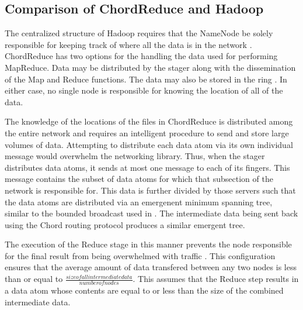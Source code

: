 \documentclass[conference, compsocconf, letterpaper]{IEEEtran}
\begin{document}
\subsection{Comparison of ChordReduce and Hadoop}

The centralized structure of Hadoop requires that the NameNode be solely responsible for keeping track of where all the data is in the network \cite{Hadoop}.  ChordReduce has two options for the handling the data used for performing MapReduce.  Data may be distributed by the stager along with the dissemination of the Map and Reduce functions.  The data may also be stored in the ring \cite{CFS}.  In either case, no single node is responsible for knowing the location of all of the data.  

The knowledge of the locations of the files in ChordReduce is distributed among the entire network and requires an intelligent procedure to send and store large volumes of data.  Attempting to distribute each data atom via its own individual message would overwhelm the networking library. Thus, when the stager distributes data atoms, it sends at most one message to each of its fingers.  This message contains the subset of data atoms for which that subsection of the network is responsible for.  This data is further divided by those servers such that the data atoms are distributed via an emergenent minimum spanning tree, similar to the bounded broadcast used in \cite{leemap}.  The intermediate data being sent back using the Chord routing protocol produces a similar emergent tree. 

The execution of the Reduce stage in this manner prevents the node responsible for the final result from being overwhelmed with traffic \cite{hadoop-bottle}.  This configuration ensures that the average amount of data transfered between any two nodes is less than or equal to $\frac{size of all intermediate data}{number of nodes}$.  This assumes that the Reduce step results in a data atom whose contents are equal to or less than the size of the combined intermediate data.  
\end{document}
